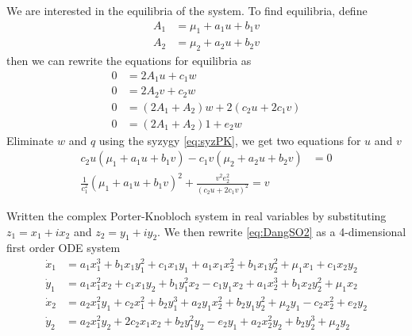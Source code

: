 \documentclass{article}
\begin{document}
We are interested in the equilibria of the system. To find equilibria, define
\begin{align}
A_1&=\mu_1+a_1u+b_1v\\
A_2&=\mu_2+a_2u+b_2v
\end{align}
then we can rewrite the equations for equilibria as
\begin{align}
0&=2A_1u+c_1w\\
0&=2A_2v+c_2w\\
0&=(2A_1+A_2)w+2(c_2u+2c_1v)\\
0&=(2A_1+A_2)1+e_2w
\end{align}
Eliminate $w$ and $q$ using the syzygy \ref{eq:syzPK}, we get two equations for $u$ and $v$
\begin{align}
c_2u(\mu_1+a_1u+b_1v)-c_1v(\mu_2+a_2u+b_2v)&=0\\
\frac{1}{c_1^2}(\mu_1+a_1u+b_1v)^2+\frac{v^2e_2^2}{(c_2u+2c_1v)^2}=v
\end{align}


Written the complex Porter-Knobloch system in real variables by
substituting $z_1 = x_1 + i x_2$ and $z_2 = y_1 + i y_2$.
We then rewrite \ref{eq:DangSO2} as a 4-dimensional first order ODE system			
			\begin{align}
				\dot{x}_1 &= a_1 x_1^3 + b_1 x_1 y_1^2 + c_1 x_1 y_1 + a_1 x_1 x_2^2 + b_1 x_1 y_2^2 + \mu_1 x_1 + c_1 x_2 y_2\\
				\dot{y}_1 &= a_1 x_1^2 x_2 + c_1 x_1 y_2 + b_1 y_1^2 x_2 - c_1 y_1 x_2 + a_1 x_2^3 + b_1 x_2 y_2^2 + \mu_1 x_2\\
				\dot{x}_2 &= a_2 x_1^2 y_1 + c_2 x_1^2 + b_2 y_1^3 + a_2 y_1 x_2^2 + b_2 y_1 y_2^2 + \mu_2 y_1 - c_2 x_2^2 + e_2 y_2\\
				\dot{y}_2 &= a_2 x_1^2 y_2 + 2 c_2 x_1 x_2 + b_2 y_1^2 y_2 - e_2 y_1 + a_2 x_2^2 y_2 + b_2 y_2^3 + \mu_2 y_2
			\end{align}
\end{document}
